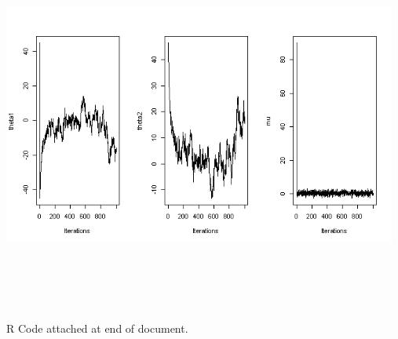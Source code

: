 \documentclass[10pt,a4paper]{article}
\begin{document}
\includegraphics[width=13cm,height=13cm,keepaspectratio]{./images/p1d_1000.png}\\
R Code attached at end of document.
\end{document}
